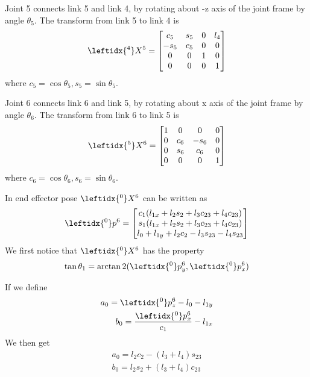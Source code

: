 \documentclass{article}
\begin{document}
Joint 5 connects link 5 and link 4, by rotating about -z axis of the joint frame by angle $\theta_5$. The transform from link 5 to link 4 is
\begin{align}
	\leftidx{^4}X^5 = \begin{bmatrix}
		c_5 & s_5 & 0 & l_4\\
		-s_5 & c_5 & 0 & 0\\
		0 & 0 & 1 & 0\\
		0 & 0 & 0 & 1
	\end{bmatrix}
\end{align}
where $c_5=\cos\theta_5,s_5=\sin\theta_5$.

Joint 6 connects link 6 and link 5, by rotating about x axis of the joint frame by angle $\theta_6$. The transform from link 6 to link 5 is
\begin{align}
	\leftidx{^5}X^6 = \begin{bmatrix}
		1 & 0 & 0 & 0\\
		0 & c_6 & -s_6 & 0\\
		0 & s_6 & c_6 & 0\\
		0 & 0 & 0 & 1
	\end{bmatrix}
\end{align}
where $c_6=\cos\theta_6, s_6=\sin\theta_6$.


In end effector pose $\leftidx{^0}X^6$ can be written as
\begin{align}
	\leftidx{^0}p^6 = \begin{bmatrix}
		c_1  (l_{1x} + l_2 s_2 + l_3  c_{23} + l_4  c_{23})\\
		s_1  (l_{1x} + l_2 s_2 + l_3  c_{23} + l_4  c_{23})\\
		l_0 + l_{1y} + l_2 c_2 - l_3  s_{23} - l_4  s_{23}
	\end{bmatrix}
\end{align}
We first notice that $\leftidx{^0}X^6$ has the property
\begin{align}
	\tan\theta_1 = \arctan2(\leftidx{^0}p^6_y, \leftidx{^0}p^6_x)
\end{align}

If we define
\begin{align}
	a_0 = \leftidx{^0}p^6_z - l_0 - l_{1y}\\
	b_0 = \frac{\leftidx{^0}p^6_x}{c_1}-l_{1x}
\end{align}
We then get
\begin{align}
	a_0 = l_2c_2 - (l_3 + l_4)s_{23}\\
	b_0 = l_2s_2+(l_3 + l_4)c_{23}
\end{align}
\end{document}
